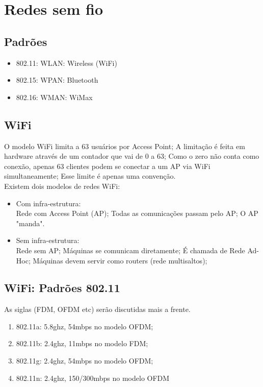 \documentclass{article}
\begin{document}
\section{Redes sem fio}

\subsection{Padrões}

\begin{itemize}
	\item 802.11: WLAN: Wireless (WiFi)
	\item 802.15: WPAN: Bluetooth
	\item 802.16: WMAN: WiMax
\end{itemize}

\subsection{WiFi}

O modelo WiFi limita a 63 usuários por Access Point; A limitação é feita em
hardware através de um contador que vai de 0 a 63; Como o zero não conta como
conexão, apenas 63 clientes podem se conectar a um AP via
WiFi simultaneamente; Esse limite é apenas uma convenção. \\
Existem dois modelos de redes WiFi:

\begin{itemize}
	\item Com infra-estrutura: \\ Rede com Access Point (AP); Todas as
comunicações passam pelo AP; O AP "manda".
	\item Sem infra-estrutura: \\ Rede sem AP; Máquinas se comunicam
diretamente; É chamada de Rede Ad-Hoc; Máquinas devem servir como routers (rede
multisaltos);
\end{itemize}

\subsection{WiFi: Padrões 802.11}

As siglas (FDM, OFDM etc) serão discutidas mais a frente.

\begin{enumerate}
	\item 802.11a: 5.8ghz, 54mbps no modelo OFDM;
	\item 802.11b: 2.4ghz, 11mbps no modelo FDM;
	\item 802.11g: 2.4ghz, 54mbps no modelo OFDM;
	\item 802.11n: 2.4ghz, 150/300mbps no modelo OFDM
\end{enumerate}
\end{document}
